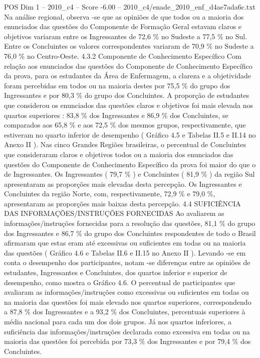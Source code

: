 \begin{textsample}{POS Dim 1 – 2010\_c4 – Score -6.00 – 2010\_c4/enade\_2010\_enf\_d4ae7ada6c.txt}
Na análise regional, observa -se que as opiniões de que todos ou a maioria dos enunciados das questões do Componente de Formação Geral estavam claros e objetivos variaram entre os Ingressantes de 72,6 \% no Sudeste a 77,5 \% no Sul.
Entre os Concluintes os valores correspondentes variaram de 70,9 \% no Sudeste a 76,0 \% no Centro-Oeste. 4.3.2 Componente de Conhecimento Específico Com relação aos enunciados das questões do Componente de Conhecimento Específico da prova, para os estudantes da Área de Enfermagem, a clareza e a objetividade foram percebidas em todos ou na maioria destes por 75,5 \% do grupo dos Ingressantes e por 80,3 \% do grupo dos Concluintes.
A proporção de estudantes que considerou os enunciados das questões claros e objetivos foi mais elevada nos quartos superiores : 83,8 \% dos Ingressantes e 86,9 \% dos Concluintes, se comparados aos 65,8 \% e aos 72,5 \% dos mesmos grupos, respectivamente, que estiveram no quarto inferior de desempenho ( Gráfico 4.5 e Tabelas II.5 e II.14 no Anexo II ).
Nas cinco Grandes Regiões brasileiras, o percentual de Concluintes que consideraram claros e objetivos todos ou a maioria dos enunciados das questões do Componente de Conhecimento Específico da prova foi maior do que o de Ingressantes.
Os Ingressantes ( 79,7 \% ) e Concluintes ( 81,9 \% ) da região Sul apresentaram as proporções mais elevadas desta percepção.
Os Ingressantes e Concluintes da região Norte, com, respectivamente, 72,9 \% e 79,0 \%, apresentaram as proporções mais baixas desta percepção. 4.4 SUFICIÊNCIA DAS INFORMAÇÕES/INSTRUÇÕES FORNECIDAS Ao avaliarem as informações/instruções fornecidas para a resolução das questões, 81,1 \% do grupo dos Ingressantes e 86,7 \% do grupo dos Concluintes respondentes de todo o Brasil afirmaram que estas eram até excessivas ou suficientes em todas ou na maioria das questões ( Gráfico 4.6 e Tabelas II.6 e II.15 no Anexo II ).
Levando -se em conta o desempenho dos participantes, notam -se diferenças entre as opiniões de estudantes, Ingressantes e Concluintes, dos quartos inferior e superior de desempenho, como mostra o Gráfico 4.6.
O percentual de participantes que avaliaram as informações/instruções como excessivas ou suficientes em todas ou na maioria das questões foi mais elevado nos quartos superiores, correspondendo a 87,8 \% dos Ingressantes e a 93,2 \% dos Concluintes, percentuais superiores à média nacional para cada um dos dois grupos.
Já nos quartos inferiores, a suficiência das informações/instruções declarada como excessiva em todas ou na maioria das questões foi percebida por 73,3 \% dos Ingressantes e por 79,4 \% dos Concluintes.

\end{textsample}
